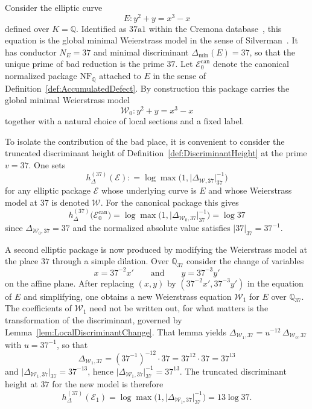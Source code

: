 \documentclass[10pt, reqno]{amsart}
\theoremstyle{plain}
\theoremstyle{definition}
\theoremstyle{plain}
\newcommand{\Q}{\mathbb{Q}}
\newcommand{\coloneqq}{\mathrel{\mathop:}=}
\begin{document}
Consider the elliptic curve
\[
  E \colon y^2 + y = x^3 - x
\]
defined over $K = \Q$. Identified as $37\mathrm{a}1$ within the Cremona database~\cite{Cremona1997}, this equation is the global minimal Weierstrass model in the sense of Silverman~\cite{SilvermanAEC}. It has conductor $N_E = 37$ and minimal discriminant $\Delta_{\min}(E) = 37$, so that the unique prime of bad reduction is the prime $37$. Let $\mathcal{E}_0^{\mathrm{can}}$ denote the canonical normalized package $\mathrm{NF}_\Q$ attached to $E$ in the sense of Definition~\ref{def:AccumulatedDefect}. By construction this package carries the global minimal Weierstrass model
\[
  \mathcal{W}_0 \colon y^2 + y = x^3 - x
\]
together with a natural choice of local sections and a fixed label.

To isolate the contribution of the bad place, it is convenient to consider the truncated discriminant height of Definition~\ref{def:DiscriminantHeight} at the prime $v = 37$. One sets
\[
  h_\Delta^{(37)}(\mathcal{E}) \coloneqq
  \log \max\bigl(1,\lvert \Delta_{\mathcal{W},37} \rvert_{37}^{-1}\bigr)
\]
for any elliptic package $\mathcal{E}$ whose underlying curve is $E$ and whose Weierstrass model at $37$ is denoted $\mathcal{W}$. For the canonical package this gives
\begin{equation}\label{eq:hDelta2-canonical}
  h_\Delta^{(37)}\bigl(\mathcal{E}_0^{\mathrm{can}}\bigr)
  =
  \log \max\bigl(1,\lvert \Delta_{\mathcal{W}_0,37} \rvert_{37}^{-1}\bigr)
  =
  \log 37
\end{equation}
since $\Delta_{\mathcal{W}_0,37} = 37$ and the normalized absolute value satisfies $\lvert 37 \rvert_{37} = 37^{-1}$.

A second elliptic package is now produced by modifying the Weierstrass model at the place $37$ through a simple dilation. Over $\Q_{37}$ consider the change of variables
\begin{equation}\label{eq:explicit-change-of-variables-37}
  x = 37^{-2} x'
  \qquad\text{and}\qquad
  y = 37^{-3} y'
\end{equation}
on the affine plane. After replacing $(x,y)$ by $(37^{-2} x', 37^{-3} y')$ in the equation of $E$ and simplifying, one obtains a new Weierstrass equation $\mathcal{W}_1$ for $E$ over $\Q_{37}$. The coefficients of $\mathcal{W}_1$ need not be written out, for what matters is the transformation of the discriminant, governed by Lemma~\ref{lem:LocalDiscriminantChange}. That lemma yields $\Delta_{\mathcal{W}_1,37} = u^{-12}\,\Delta_{\mathcal{W}_0,37}$ with $u = 37^{-1}$, so that
\[
  \Delta_{\mathcal{W}_1,37} = (37^{-1})^{-12} \cdot 37 = 37^{12}\cdot 37 = 37^{13}
\]
and $\lvert \Delta_{\mathcal{W}_1,37} \rvert_{37} = 37^{-13}$, hence $\lvert \Delta_{\mathcal{W}_1,37} \rvert_{37}^{-1} = 37^{13}$. The truncated discriminant height at $37$ for the new model is therefore
\begin{equation}\label{eq:hDelta2-new}
  h_\Delta^{(37)}(\mathcal{E}_1)
  =
  \log \max\bigl(1,\lvert \Delta_{\mathcal{W}_1,37} \rvert_{37}^{-1}\bigr)
  =
  13 \log 37.
\end{equation}
\end{document}
